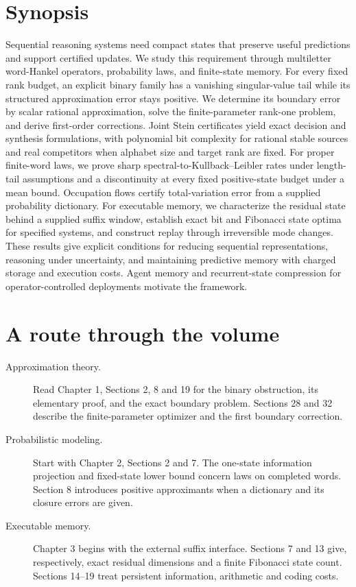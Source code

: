 \documentclass[11pt,oneside,openany]{book}
\theoremstyle{definition}
\theoremstyle{remark}
\begin{document}
\section*{Synopsis}
Sequential reasoning systems need compact states that preserve useful predictions and support certified updates. We study this requirement through multiletter word-Hankel operators, probability laws, and finite-state memory. For every fixed rank budget, an explicit binary family has a vanishing singular-value tail while its structured approximation error stays positive. We determine its boundary error by scalar rational approximation, solve the finite-parameter rank-one problem, and derive first-order corrections. Joint Stein certificates yield exact decision and synthesis formulations, with polynomial bit complexity for rational stable sources and real competitors when alphabet size and target rank are fixed. For proper finite-word laws, we prove sharp spectral-to-Kullback--Leibler rates under length-tail assumptions and a discontinuity at every fixed positive-state budget under a mean bound. Occupation flows certify total-variation error from a supplied probability dictionary. For executable memory, we characterize the residual state behind a supplied suffix window, establish exact bit and Fibonacci state optima for specified systems, and construct replay through irreversible mode changes. These results give explicit conditions for reducing sequential representations, reasoning under uncertainty, and maintaining predictive memory with charged storage and execution costs. Agent memory and recurrent-state compression for operator-controlled deployments motivate the framework.
\section*{A route through the volume}
\begin{description}
\item[Approximation theory.] Read Chapter 1, Sections 2, 8 and 19 for the binary
obstruction, its elementary proof, and the exact boundary problem. Sections 28 and
32 describe the finite-parameter optimizer and the first boundary correction.
\item[Probabilistic modeling.] Start with Chapter 2, Sections 2 and 7.
The one-state information projection and fixed-state lower bound concern laws
on completed words. Section 8 introduces positive approximants when a dictionary
and its closure errors are given.
\item[Executable memory.] Chapter 3 begins with the external suffix interface.
Sections 7 and 13 give, respectively, exact residual dimensions and a finite Fibonacci
state count. Sections 14--19 treat persistent information, arithmetic and coding costs.
\end{description}
\end{document}
